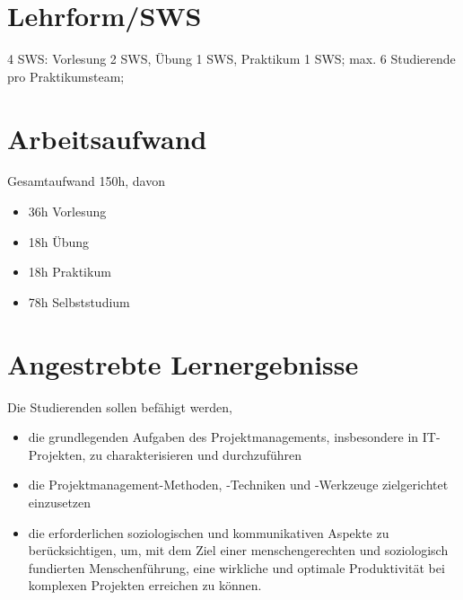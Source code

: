 \hypertarget{lehrformswspathlabelmi-2017modulbeschreibungen-bachelorba_projektmanagement}{%
\section*{Lehrform/SWS\label{/mi-2017/modulbeschreibungen-bachelor/BA_Projektmanagement}}\label{lehrformswspathlabelmi-2017modulbeschreibungen-bachelorba_projektmanagement}}

4 SWS: Vorlesung 2 SWS, Übung 1 SWS, Praktikum 1 SWS; max. 6 Studierende
pro Praktikumsteam;

\hypertarget{arbeitsaufwandpathlabelmi-2017modulbeschreibungen-bachelorba_projektmanagement}{%
\section*{Arbeitsaufwand\label{/mi-2017/modulbeschreibungen-bachelor/BA_Projektmanagement}}\label{arbeitsaufwandpathlabelmi-2017modulbeschreibungen-bachelorba_projektmanagement}}

Gesamtaufwand 150h, davon

\begin{itemize}
\tightlist
\item
  36h Vorlesung
\item
  18h Übung
\item
  18h Praktikum
\item
  78h Selbststudium
\end{itemize}

\hypertarget{angestrebte-lernergebnissepathlabelmi-2017modulbeschreibungen-bachelorba_projektmanagement}{%
\section*{Angestrebte
Lernergebnisse\label{/mi-2017/modulbeschreibungen-bachelor/BA_Projektmanagement}}\label{angestrebte-lernergebnissepathlabelmi-2017modulbeschreibungen-bachelorba_projektmanagement}}

Die Studierenden sollen befähigt werden,

\begin{itemize}
\tightlist
\item
  die grundlegenden Aufgaben des Projektmanagements, insbesondere in
  IT-Projekten, zu charakterisieren und durchzuführen
\item
  die Projektmanagement-Methoden, -Techniken und -Werkzeuge
  zielgerichtet einzusetzen
\item
  die erforderlichen soziologischen und kommunikativen Aspekte zu
  berücksichtigen, um, mit dem Ziel einer menschengerechten und
  soziologisch fundierten Menschenführung, eine wirkliche und optimale
  Produktivität bei komplexen Projekten erreichen zu können.
\end{itemize}

